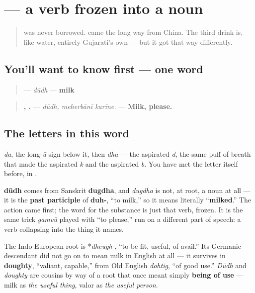 \section[\texorpdfstring{\gu{દૂધ} (dūdh)}{દૂધ (dūdh)}]{ — a verb frozen into a noun}

\label{lesson:GU-C10-dudh}



\begin{quote}
\textbf{} was never borrowed. \textbf{} came the long way from China. The third drink is, like water, entirely Gujarati's own — but it got that way differently.
\end{quote}

\subsection*{You'll want to know first — one word}
\begin{quote}
\textbf{} — \emph{dūdh} — \textbf{milk}
\end{quote}

\begin{quote}
\textbf{,  .} — \emph{dūdh, meherbānī karīne.} — \textbf{Milk, please.}
\end{quote}

\subsection*{The letters in this word}
\textbf{} \emph{da}, \textbf{} the long-\emph{ū} sign below it, then \textbf{} \emph{dha} — the aspirated \emph{d}, the same puff of breath that made \textbf{} the aspirated \emph{k} and \textbf{} the aspirated \emph{b}. You have met the letter itself before, in \textbf{ }.

\begin{cousinweb}
\textbf{dūdh} comes from Sanskrit \textbf{dugdha}, and \emph{dugdha} is not, at root, a noun at all — it is the \textbf{past participle} of \textbf{duh-}, \textquotedblleft{}to milk,\textquotedblright{} so it means literally \textquotedblleft{}\textbf{milked}.\textquotedblright{} The action came first; the word for the substance is just that verb, frozen. It is the same trick \emph{gamvũ} played with \textquotedblleft{}to please,\textquotedblright{} run on a different part of speech: a verb collapsing into the thing it names.

The Indo-European root is *\emph{dheugh-}, \textquotedblleft{}to be fit, useful, of avail.\textquotedblright{} Its Germanic descendant did not go on to mean milk in English at all — it survives in \textbf{doughty}, \textquotedblleft{}valiant, capable,\textquotedblright{} from Old English \emph{dohtig}, \textquotedblleft{}of good use.\textquotedblright{} \emph{Dūdh} and \emph{doughty} are cousins by way of a root that once meant simply \textbf{being of use} — milk as \emph{the useful thing}, valor as \emph{the useful person}.
\end{cousinweb}

